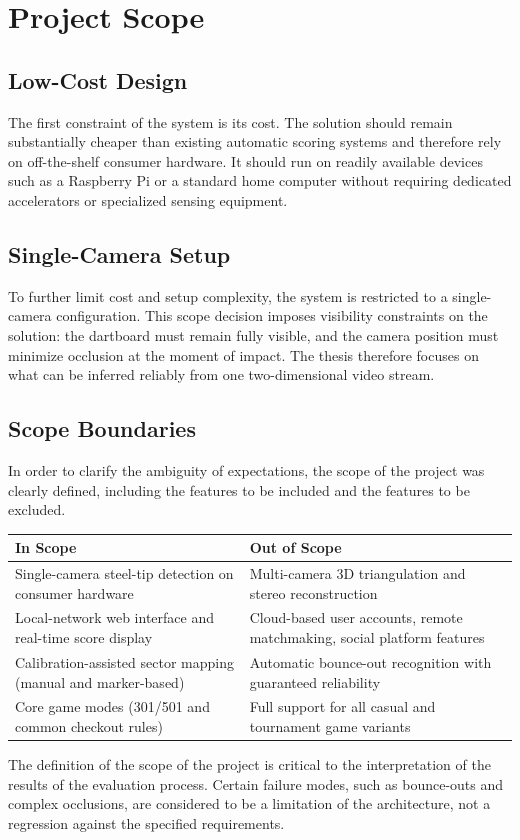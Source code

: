 \section{Project Scope}

\subsection{Low-Cost Design}

The first constraint of the system is its cost. The solution should remain substantially cheaper than existing automatic scoring systems and therefore rely on off-the-shelf consumer hardware. It should run on readily available devices such as a Raspberry Pi or a standard home computer without requiring dedicated accelerators or specialized sensing equipment.

\subsection{Single-Camera Setup}

To further limit cost and setup complexity, the system is restricted to a single-camera configuration. This scope decision imposes visibility constraints on the solution: the dartboard must remain fully visible, and the camera position must minimize occlusion at the moment of impact. The thesis therefore focuses on what can be inferred reliably from one two-dimensional video stream.

\subsection{Scope Boundaries}

In order to clarify the ambiguity of expectations, the scope of the project was clearly defined, including the features to be included and the features to be excluded.

\begin{center}
\captionsetup{type=table,hypcap=false}
	\centering
	\caption{In-scope and out-of-scope boundaries for this thesis.}
	\label{tab:scope_boundaries}
	\begin{tabularx}{\linewidth}{@{}X X@{}}
		\toprule
		\textbf{In Scope} & \textbf{Out of Scope} \\
		\midrule
		Single-camera steel-tip detection on consumer hardware & Multi-camera 3D triangulation and stereo reconstruction \\
		Local-network web interface and real-time score display & Cloud-based user accounts, remote matchmaking, social platform features \\
		Calibration-assisted sector mapping (manual and marker-based) & Automatic bounce-out recognition with guaranteed reliability \\
		Core game modes (301/501 and common checkout rules) & Full support for all casual and tournament game variants \\
		\bottomrule
	\end{tabularx}
\end{center}

The definition of the scope of the project is critical to the interpretation of the results of the evaluation process. Certain failure modes, such as bounce-outs and complex occlusions, are considered to be a limitation of the architecture, not a regression against the specified requirements.